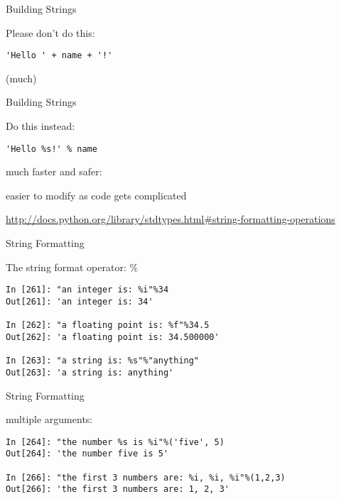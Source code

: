 \documentclass{beamer}
\begin{document}
\begin{frame}[fragile]{Building Strings}

{\Large Please don't do this:

\vfill
\begin{verbatim}
'Hello ' + name + '!'
\end{verbatim}
}
\vfill
(much)

\end{frame} 

\begin{frame}[fragile]{Building Strings}

{\Large Do this instead:

\vfill
\begin{verbatim}
'Hello %s!' % name
\end{verbatim}

\vfill
much faster and safer:

\vfill
easier to modify as code gets complicated
}

\vfill
\url{http://docs.python.org/library/stdtypes.html#string-formatting-operations}
\end{frame} 


\begin{frame}[fragile]{String Formatting}

{\Large The string format operator: \%}

\begin{verbatim}
In [261]: "an integer is: %i"%34
Out[261]: 'an integer is: 34'

In [262]: "a floating point is: %f"%34.5
Out[262]: 'a floating point is: 34.500000'

In [263]: "a string is: %s"%"anything"
Out[263]: 'a string is: anything'
\end{verbatim}

\end{frame} 

\begin{frame}[fragile]{String Formatting}

{\Large multiple arguments:}

\begin{verbatim}
In [264]: "the number %s is %i"%('five', 5)
Out[264]: 'the number five is 5'

In [266]: "the first 3 numbers are: %i, %i, %i"%(1,2,3)
Out[266]: 'the first 3 numbers are: 1, 2, 3'

\end{verbatim}

\end{frame} 
\end{document}
